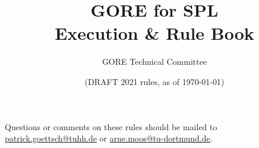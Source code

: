 \documentclass[12pt]{article}
\title{GORE for SPL\\ Execution \& Rule Book}
\author{GORE Technical Committee}
\date{(DRAFT 2021 rules, as of \today)}
\begin{document}
  \maketitle

  \begin{center}
  Questions or comments on these rules should be mailed to \\\url{patrick.goettsch@tuhh.de} or \url{arne.moos@tu-dortmund.de}.
  \end{center}

  \newpage

  \setcounter{tocdepth}{4}
  \setcounter{secnumdepth}{4}
  \tableofcontents

  \thispagestyle{fancy}

  \clearpage

  \cfoot{\thepage}
  \setcounter{page}{1}

  \newpage

  
  \newpage
  
  \newpage
  
\end{document}
